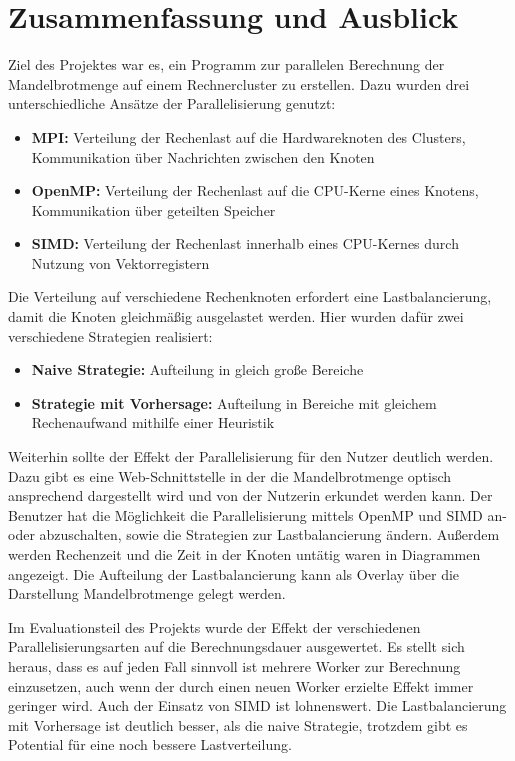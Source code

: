 \section{Zusammenfassung und Ausblick}


Ziel des Projektes war es, ein Programm zur parallelen Berechnung der Mandelbrotmenge auf einem Rechnercluster zu erstellen.
Dazu wurden drei unterschiedliche Ansätze der Parallelisierung genutzt:
\begin{itemize}
	\item \textbf{MPI:} Verteilung der Rechenlast auf die Hardwareknoten des Clusters, Kommunikation über Nachrichten zwischen den Knoten
	\item \textbf{OpenMP:} Verteilung der Rechenlast auf die CPU-Kerne eines Knotens, Kommunikation über geteilten Speicher
	\item \textbf{SIMD:} Verteilung der Rechenlast innerhalb eines CPU-Kernes durch Nutzung von Vektorregistern
\end{itemize}

Die Verteilung auf verschiedene Rechenknoten erfordert eine Lastbalancierung, damit die Knoten gleichmäßig ausgelastet werden.
Hier wurden dafür zwei verschiedene Strategien realisiert:
\begin{itemize}
	\item \textbf{Naive Strategie:} Aufteilung in gleich große Bereiche
	\item \textbf{Strategie mit Vorhersage:} Aufteilung in Bereiche mit gleichem Rechenaufwand mithilfe einer Heuristik
\end{itemize}

Weiterhin sollte der Effekt der Parallelisierung für den Nutzer deutlich werden.
Dazu gibt es eine Web-Schnittstelle in der die Mandelbrotmenge optisch ansprechend dargestellt wird und von der Nutzerin erkundet werden kann.
Der Benutzer hat die Möglichkeit die Parallelisierung mittels OpenMP und SIMD an- oder abzuschalten, sowie die Strategien zur Lastbalancierung ändern.
Außerdem werden Rechenzeit und die Zeit in der Knoten untätig waren in Diagrammen angezeigt.
Die Aufteilung der Lastbalancierung kann als Overlay über die Darstellung Mandelbrotmenge gelegt werden.

Im Evaluationsteil des Projekts wurde der Effekt der verschiedenen Parallelisierungsarten auf die Berechnungsdauer ausgewertet.
Es stellt sich heraus, dass es auf jeden Fall sinnvoll ist mehrere Worker zur Berechnung einzusetzen, auch wenn der durch einen neuen Worker erzielte Effekt immer geringer wird.
Auch der Einsatz von SIMD ist lohnenswert. %
Die Lastbalancierung mit Vorhersage ist deutlich besser, als die naive Strategie, trotzdem gibt es Potential für eine noch bessere Lastverteilung.

